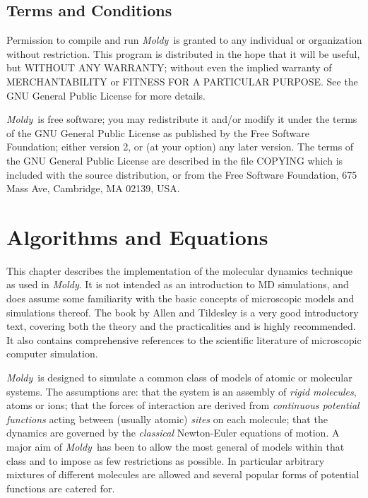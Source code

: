 \documentclass[a4paper,twoside]{report}
\newcommand{\Fname}[1]{{\upshape\mdseries\sffamily#1}}
\newcommand{\moldy}{\emph{Moldy}}
\begin{document}
\section{Terms and Conditions}%

Permission to compile and run \moldy\ is granted to any individual or
organization without restriction.  This program is distributed in the
hope that it will be useful, but WITHOUT ANY WARRANTY; without even
the implied warranty of MERCHANTABILITY or FITNESS FOR A PARTICULAR
PURPOSE.  See the GNU General Public License for more details.

\moldy\ is free software; you may redistribute it and/or modify it
under the terms of the GNU General Public License as published by the
Free Software Foundation; either version 2, or (at your option) any
later version.  The terms of the GNU General Public License are
described in the file \Fname{COPYING} which is included with the
source distribution, or from the Free Software Foundation, 675 Mass
Ave, Cambridge, MA 02139, USA.

\chapter{Algorithms and Equations}  %

This chapter  describes the implementation  of the  molecular dynamics
technique as used in \moldy.  It is not intended as an introduction to
MD  simulations, and  does assume some    familiarity  with the  basic
concepts of microscopic models  and simulations thereof.  The book  by
Allen and Tildesley\cite{allen:87}  is a  very good    introductory text,
covering   both the  theory  and  the  practicalities and  is   highly
recommended.  It   also  contains   comprehensive  references  to  the
scientific literature of microscopic computer simulation.

\moldy\  is designed to simulate a common class of models of atomic or
molecular systems. The assumptions are: that the system is an assembly
of  \emph{rigid   molecules},  atoms   or  ions;  that  the  forces  of
interaction are derived   from \emph{continuous  potential  functions}
acting between (usually atomic) \emph{sites} on each molecule; that the
dynamics are governed by the \emph{classical} Newton-Euler equations of
motion.  A major aim of \moldy\ has been to allow the most  general of
models within that class and to impose as few restrictions as possible.
In particular arbitrary mixtures of different molecules are allowed
and several popular forms of potential functions are catered for.
\end{document}
